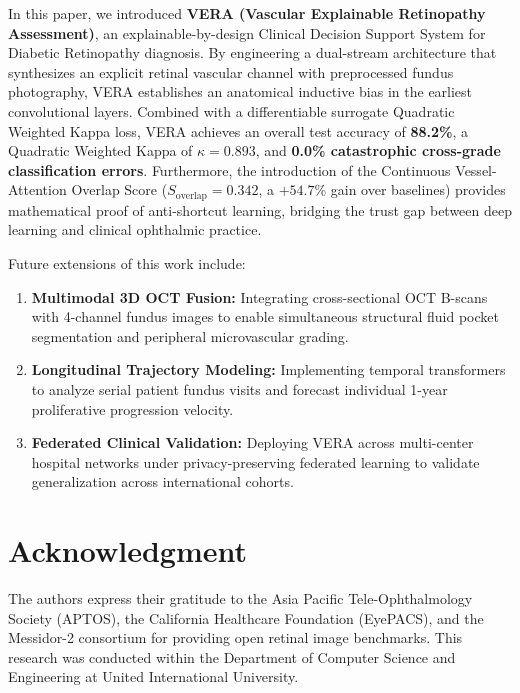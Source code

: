 \documentclass[conference]{IEEEtran}
\begin{document}
In this paper, we introduced \textbf{VERA (Vascular Explainable Retinopathy Assessment)}, an explainable-by-design Clinical Decision Support System for Diabetic Retinopathy diagnosis. By engineering a dual-stream architecture that synthesizes an explicit retinal vascular channel with preprocessed fundus photography, VERA establishes an anatomical inductive bias in the earliest convolutional layers. Combined with a differentiable surrogate Quadratic Weighted Kappa loss, VERA achieves an overall test accuracy of \textbf{88.2\%}, a Quadratic Weighted Kappa of \textbf{$\kappa = 0.893$}, and \textbf{0.0\% catastrophic cross-grade classification errors}. Furthermore, the introduction of the Continuous Vessel-Attention Overlap Score ($S_{\text{overlap}} = 0.342$, a $+54.7\%$ gain over baselines) provides mathematical proof of anti-shortcut learning, bridging the trust gap between deep learning and clinical ophthalmic practice.

Future extensions of this work include:
\begin{enumerate}
    \item \textbf{Multimodal 3D OCT Fusion:} Integrating cross-sectional OCT B-scans with 4-channel fundus images to enable simultaneous structural fluid pocket segmentation and peripheral microvascular grading.
    \item \textbf{Longitudinal Trajectory Modeling:} Implementing temporal transformers to analyze serial patient fundus visits and forecast individual 1-year proliferative progression velocity.
    \item \textbf{Federated Clinical Validation:} Deploying VERA across multi-center hospital networks under privacy-preserving federated learning to validate generalization across international cohorts.
\end{enumerate}

\section*{Acknowledgment}
The authors express their gratitude to the Asia Pacific Tele-Ophthalmology Society (APTOS), the California Healthcare Foundation (EyePACS), and the Messidor-2 consortium for providing open retinal image benchmarks. This research was conducted within the Department of Computer Science and Engineering at United International University.
\end{document}
